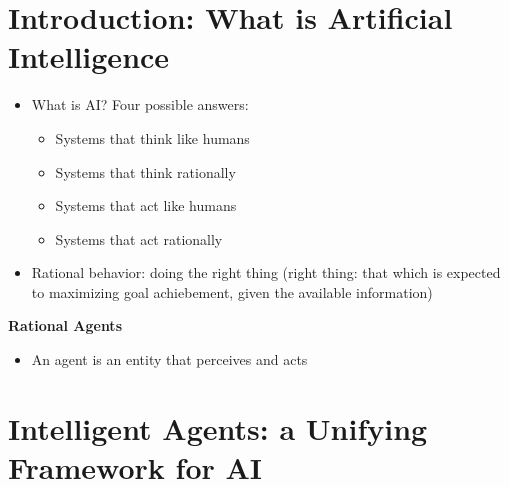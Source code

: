 \documentclass{scrartcl}
\begin{document}
\tableofcontents
\newpage

\section{Introduction: What is Artificial Intelligence}
\begin{itemize}
    \item
        What is AI? Four possible answers:
        \begin{itemize}
            \item
                Systems that think like humans
            \item
                Systems that think rationally
            \item
                Systems that act like humans
            \item
                Systems that act rationally
        \end{itemize}
    \item
        Rational behavior: doing the right thing (right thing: that which is expected to maximizing goal achiebement, given the available information)
\end{itemize}
\textbf{Rational Agents}
\begin{itemize}
    \item
        An agent is an entity that perceives and acts 
\end{itemize}
\section{Intelligent Agents: a Unifying Framework for AI}
\end{document}
